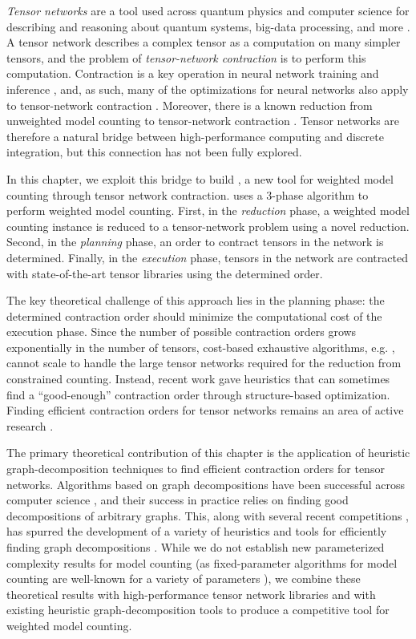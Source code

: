 \emph{Tensor networks} are a tool used across quantum physics and computer science for describing and reasoning about quantum systems, big-data processing, and more \cite{BB17,Cichocki14,Orus19}.
A tensor network describes a complex tensor as a computation on many simpler tensors, and the problem of \emph{tensor-network contraction} is to perform this computation. 
Contraction is a key operation in neural network training and inference \cite{BK07,Hirata03,KKCLA17,VZTGDMVAC18}, and, as such, many of the optimizations for neural networks also apply to tensor-network contraction \cite{KSTKPPRS19,NRBHHJN15,RMGZFZHVL19}.
Moreover, there is a known reduction from unweighted model counting to tensor-network contraction \cite{BMT15}.
Tensor networks are therefore a natural bridge between high-performance computing and discrete integration, but this connection has not been fully explored.

In this chapter, we exploit this bridge to build , a new tool for weighted model counting through tensor network contraction.  uses a 3-phase algorithm to perform weighted model counting. First, in the \emph{reduction} phase, a weighted model counting instance is reduced to a tensor-network problem using a novel reduction. Second, in the \emph{planning} phase, an order to contract tensors in the network is determined. Finally, in the \emph{execution} phase, tensors in the network are contracted with state-of-the-art tensor libraries using the determined order.

The key theoretical challenge of this approach lies in the planning phase: the determined contraction order should minimize the computational cost of the execution phase. Since the number of possible contraction orders grows exponentially in the number of tensors, cost-based exhaustive algorithms, e.g. \cite{PHV14}, cannot scale to handle the large tensor networks required for the reduction from constrained counting. Instead, recent work \cite{KCMR18} gave heuristics that can sometimes find a ``good-enough'' contraction order through structure-based optimization. Finding efficient contraction orders for tensor networks remains an area of active research \cite{RTPCTSL19}.

The primary theoretical contribution of this chapter is the application of heuristic graph-decomposition techniques to find efficient contraction orders for tensor networks. Algorithms based on graph decompositions have been successful across computer science \cite{GLST17,MPPV04}, and their success in practice relies on finding good decompositions of arbitrary graphs. This, along with several recent competitions \cite{DKTW18}, has spurred the development of a variety of heuristics and tools for efficiently finding graph decompositions \cite{AMW17,HS18,Tamaki17}. While we do not establish new parameterized complexity results for model counting (as fixed-parameter algorithms for model counting are well-known for a variety of parameters \cite{FMR08,SS10}), we combine these theoretical results with high-performance tensor network libraries and with existing heuristic graph-decomposition tools to produce a competitive tool for weighted model counting.

